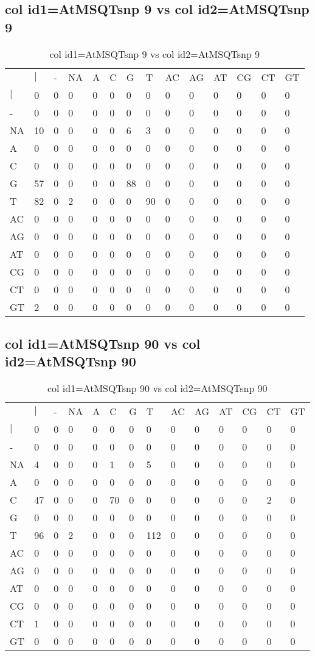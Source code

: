 \subsection{col id1=AtMSQTsnp 9 vs col id2=AtMSQTsnp 9}
\begin{center}
\begin{longtable}{|l|l|l|l|l|l|l|l|l|l|l|l|l|l|}
\caption{col id1=AtMSQTsnp 9 vs col id2=AtMSQTsnp 9} \label{table_dm970}\\
\hline
\\
\hline
&$|$&-&NA&A&C&G&T&AC&AG&AT&CG&CT&GT\\
$|$&0&0&0&0&0&0&0&0&0&0&0&0&0\\
-&0&0&0&0&0&0&0&0&0&0&0&0&0\\
NA&10&0&0&0&0&6&3&0&0&0&0&0&0\\
A&0&0&0&0&0&0&0&0&0&0&0&0&0\\
C&0&0&0&0&0&0&0&0&0&0&0&0&0\\
G&57&0&0&0&0&88&0&0&0&0&0&0&0\\
T&82&0&2&0&0&0&90&0&0&0&0&0&0\\
AC&0&0&0&0&0&0&0&0&0&0&0&0&0\\
AG&0&0&0&0&0&0&0&0&0&0&0&0&0\\
AT&0&0&0&0&0&0&0&0&0&0&0&0&0\\
CG&0&0&0&0&0&0&0&0&0&0&0&0&0\\
CT&0&0&0&0&0&0&0&0&0&0&0&0&0\\
GT&2&0&0&0&0&0&0&0&0&0&0&0&0\\
\hline
\end{longtable}
\end{center}

\subsection{col id1=AtMSQTsnp 90 vs col id2=AtMSQTsnp 90}
\begin{center}
\begin{longtable}{|l|l|l|l|l|l|l|l|l|l|l|l|l|l|}
\caption{col id1=AtMSQTsnp 90 vs col id2=AtMSQTsnp 90} \label{table_dm972}\\
\hline
\\
\hline
&$|$&-&NA&A&C&G&T&AC&AG&AT&CG&CT&GT\\
$|$&0&0&0&0&0&0&0&0&0&0&0&0&0\\
-&0&0&0&0&0&0&0&0&0&0&0&0&0\\
NA&4&0&0&0&1&0&5&0&0&0&0&0&0\\
A&0&0&0&0&0&0&0&0&0&0&0&0&0\\
C&47&0&0&0&70&0&0&0&0&0&0&2&0\\
G&0&0&0&0&0&0&0&0&0&0&0&0&0\\
T&96&0&2&0&0&0&112&0&0&0&0&0&0\\
AC&0&0&0&0&0&0&0&0&0&0&0&0&0\\
AG&0&0&0&0&0&0&0&0&0&0&0&0&0\\
AT&0&0&0&0&0&0&0&0&0&0&0&0&0\\
CG&0&0&0&0&0&0&0&0&0&0&0&0&0\\
CT&1&0&0&0&0&0&0&0&0&0&0&0&0\\
GT&0&0&0&0&0&0&0&0&0&0&0&0&0\\
\hline
\end{longtable}
\end{center}

